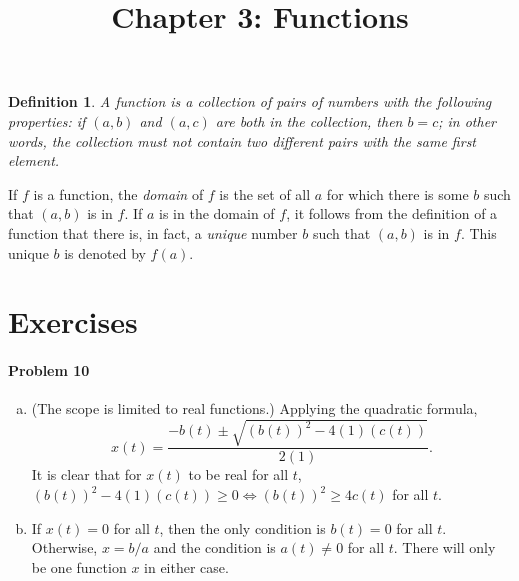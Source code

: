 \documentclass{article}
\newtheorem{definition}{Definition}
\begin{document}
\title{Chapter 3: Functions}
\maketitle

\begin{definition}
  A \emph{function} is a collection of pairs of numbers with the following
  properties: if $(a, b)$ and $(a, c)$ are both in the collection, then $b =
  c$; in other words, the collection must not contain two different pairs with
  the same first element.
\end{definition}

If $f$ is a function, the \emph{domain} of $f$ is the set of all $a$ for which
there is some $b$ such that $(a, b)$ is in $f$. If $a$ is in the domain of $f$,
it follows from the definition of a function that there is, in fact, a
\emph{unique} number $b$ such that $(a, b)$ is in $f$. This unique $b$ is
denoted by $f(a)$.

\section*{Exercises}

\paragraph{Problem 10}
\begin{enumerate}[(c)]
  \item (The scope is limited to real functions.) Applying the quadratic
    formula, \[
      x(t) = \frac{-b(t) \pm \sqrt{(b(t))^2 - 4(1)(c(t))}}{2(1)}.
    \] It is clear that for $x(t)$ to be real for all $t$, $(b(t))^2 -
    4(1)(c(t)) \geq 0 \iff (b(t))^2 \geq 4c(t)$ for all $t$.
  \item If $x(t) = 0$ for all $t$, then the only condition is $b(t) = 0$ for
    all $t$. Otherwise, $x = b/a$ and the condition is $a(t) \neq 0$ for all
    $t$. There will only be one function $x$ in either case.
\end{enumerate}
\end{document}
